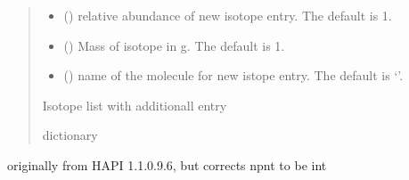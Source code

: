 \documentclass[letterpaper,10pt,english]{sphinxmanual}
\begin{document}
\begin{fulllineitems}
\begin{quote}
\begin{description}
\begin{itemize}
\item {} 
\sphinxAtStartPar
{} (\sphinxstyleliteralemphasis{\sphinxupquote{, }}) \textendash{} relative abundance of new isotope entry. The default is 1.

\item {} 
\sphinxAtStartPar
{} (\sphinxstyleliteralemphasis{\sphinxupquote{, }}) \textendash{} Mass of isotope in g. The default is 1.

\item {} 
\sphinxAtStartPar
{} (\sphinxstyleliteralemphasis{\sphinxupquote{, }}) \textendash{} name of the molecule for new istope entry. The default is ‘’.

\end{itemize}

\sphinxAtStartPar
{} \textendash{} Isotope list with additionall entry

\sphinxAtStartPar
dictionary

\end{description}\end{quote}

\end{fulllineitems}


\begin{fulllineitems}
\label{\detokenize{MATS:MATS.utilities.arange_}}
\pysigstartsignatures
{}
\pysigstopsignatures
\sphinxAtStartPar
originally from HAPI 1.1.0.9.6, but corrects npnt to be int

\end{fulllineitems}

\end{document}
